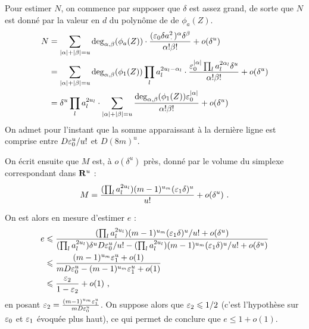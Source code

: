 Pour estimer $N$, on commence par supposer que $\delta$ est assez grand, de
sorte que $N$ est donné par la valeur en $d$ du polynôme de  de
$\phi_a(Z)$.
\begin{align*}
  N
  & = \sum_{\lgr\alpha + \lgr\beta = u}
    \deg_{\alpha, \beta}(\phi_a(Z))
    \cdot \frac{
      (\eps_0 \delta a_\truc^2)^\alpha \delta^\beta}{%
      \alpha! \beta!}
    + o(\delta^u) \\
  & = \sum_{\lgr\alpha + \lgr\beta = u}
    \deg_{\alpha, \beta}(\phi_1(Z)) \prod_l a_l^{2u_l - \alpha_l}
    \cdot \frac{
      \eps_0^{\lgr\alpha} \prod_l a_l^{2\alpha_l} \delta^u}{%
      \alpha! \beta!}
    + o(\delta^u) \\
  & = \delta^u \prod_l a_l^{2u_l} \cdot
    \sum_{\lgr\alpha + \lgr\beta = u}
    \frac{
      \deg_{\alpha, \beta} (\phi_1(Z)) \eps_0^{\lgr\alpha}}{
      \alpha! \beta!}
    + o(\delta^u)
\end{align*}
On admet pour l'instant que la somme apparaissant à la dernière ligne est
comprise entre $D \varepsilon_0^u / u!$ et $D (8m)^u$.

On écrit ensuite que $M$ est, à $o(\delta^u)$ près, donné par le volume du
simplexe correspondant dans $\mathbf{R}^u$ :
\[
  M = \frac{
    (\prod_l a_l^{2u_l}) (m-1)^{u_m} (\varepsilon_1 \delta)^u}{
    u!}
  + o(\delta^u) \text{ .}
\]

On est alors en mesure d'estimer $e$ :
\begin{align*}
  e
  & \leqslant \frac{
      (\prod_l a_l^{2u_l}) (m-1)^{u_m} (\varepsilon_1 \delta)^u / u! + o(\delta^u)}{
      (\prod_l a_l^{2u_l}) \delta^u D \varepsilon_0^u / u!
      - (\prod_l a_l^{2u_l}) (m-1)^{u_m} (\varepsilon_1 \delta)^u / u! +o(\delta^u)} \\
  & \leqslant \frac{
      (m-1)^{u_m} \varepsilon_1^u + o(1)}{
      mD\varepsilon_0^u - (m-1)^{u_m} \varepsilon_1^u + o(1)} \\
  & \leqslant \frac {\varepsilon_2} {1 - \varepsilon_2} + o(1) \text{ ,}
\end{align*}
en posant $\varepsilon_2 = \frac {(m-1)^{u_m} \varepsilon_1^u} {m D\varepsilon_0^u}$. On
suppose alors que $\varepsilon_2 \leqslant 1/2$ (c'est l'hypothèse sur $\varepsilon_0$ et $\varepsilon_1$
évoquée plus haut), ce qui permet de conclure que $e \le 1 + o(1)$.

